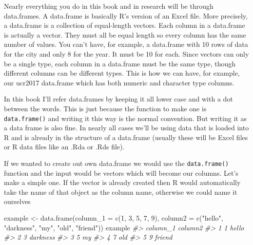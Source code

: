 \documentclass[
]{krantz}
\makeatletter
\newenvironment{Shaded}{\begin{snugshade}}{\end{snugshade}}
\newcommand{\AttributeTok}[1]{\textcolor[rgb]{0.61,0.61,0.61}{#1}}
\newcommand{\CommentTok}[1]{\textcolor[rgb]{0.37,0.37,0.37}{\textit{#1}}}
\newcommand{\DecValTok}[1]{\textcolor[rgb]{0.06,0.06,0.06}{#1}}
\newcommand{\FunctionTok}[1]{\textcolor[rgb]{0,0,0}{#1}}
\newcommand{\NormalTok}[1]{#1}
\newcommand{\OtherTok}[1]{\textcolor[rgb]{0.37,0.37,0.37}{#1}}
\newcommand{\StringTok}[1]{\textcolor[rgb]{0.5,0.5,0.5}{#1}}
\newenvironment{kframe}{%
\medskip{}
\setlength{\fboxsep}{.8em}
 \def\at@end@of@kframe{}%
 \ifinner\ifhmode%
  \def\at@end@of@kframe{\end{minipage}}%
  \begin{minipage}{\columnwidth}%
 \fi\fi%
 \def\FrameCommand##1{\hskip\@totalleftmargin \hskip-\fboxsep
 \colorbox{shadecolor}{##1}\hskip-\fboxsep
     \hskip-\linewidth \hskip-\@totalleftmargin \hskip\columnwidth}%
 \MakeFramed {\advance\hsize-\width
   \@totalleftmargin\z@ \linewidth\hsize
   \@setminipage}}%
 {\par\unskip\endMakeFramed%
 \at@end@of@kframe}
\renewenvironment{Shaded}{\begin{kframe}}{\end{kframe}}
\makeatother
\begin{document}
Nearly everything you do in this book and in research will be through data.frames. A data.frame is basically R's version of an Excel file. More precisely, a data.frame is a collection of equal-length vectors. Each column in a data.frame is actually a vector. They must all be equal length so every column has the same number of values. You can't have, for example, a data.frame with 10 rows of data for the city and only 8 for the year. It must be 10 for each. Since vectors can only be a single type, each column in a data.frame must be the same type, though different columns can be different types. This is how we can have, for example, our ucr2017 data.frame which has both numeric and character type columns.

In this book I'll refer data.frames by keeping it all lower case and with a dot between the words. This is just because the function to make one is \texttt{data.frame()} and writing it this way is the normal convention. But writing it as a data frame is also fine. In nearly all cases we'll be using data that is loaded into R and is already in the structure of a data.frame (usually these will be Excel files or R data files like an .Rda or .Rds file).

If we wanted to create out own data.frame we would use the \texttt{data.frame()} function and the input would be vectors which will become our columns. Let's make a simple one. If the vector is already created then R would automatically take the name of that object as the column name, otherwise we could name it ourselves

\begin{Shaded}
\begin{Highlighting}[]
\NormalTok{example }\OtherTok{\textless{}{-}} \FunctionTok{data.frame}\NormalTok{(}\AttributeTok{column\_1 =} \FunctionTok{c}\NormalTok{(}\DecValTok{1}\NormalTok{, }\DecValTok{3}\NormalTok{, }\DecValTok{5}\NormalTok{, }\DecValTok{7}\NormalTok{, }\DecValTok{9}\NormalTok{),}
                      \AttributeTok{column2  =} \FunctionTok{c}\NormalTok{(}\StringTok{"hello"}\NormalTok{, }\StringTok{"darkness"}\NormalTok{, }\StringTok{"my"}\NormalTok{, }\StringTok{"old"}\NormalTok{, }\StringTok{"friend"}\NormalTok{))}
\NormalTok{example}
\CommentTok{\#\textgreater{}   column\_1  column2}
\CommentTok{\#\textgreater{} 1        1    hello}
\CommentTok{\#\textgreater{} 2        3 darkness}
\CommentTok{\#\textgreater{} 3        5       my}
\CommentTok{\#\textgreater{} 4        7      old}
\CommentTok{\#\textgreater{} 5        9   friend}
\end{Highlighting}
\end{Shaded}
\end{document}
